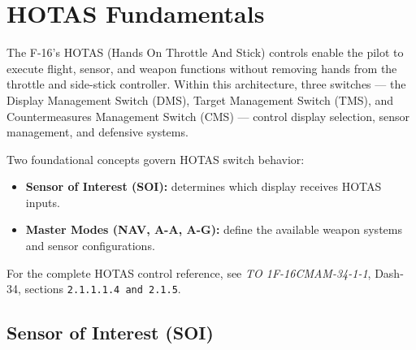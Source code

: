 \documentclass[11pt, a4paper, twoside]{report}
\newcommand{\dashrefs}[1]{\textit{TO 1F-16CMAM-34-1-1}, Dash-34, sections \texttt{#1}}
\begin{document}

\chapter{HOTAS Fundamentals}
\label{chap:C2}
The F-16’s HOTAS (Hands On Throttle And Stick) controls enable the pilot to execute flight, sensor, and weapon functions without removing hands from the throttle and side-stick controller. Within this architecture, three switches — the Display Management Switch (DMS), Target Management Switch (TMS), and Countermeasures Management Switch (CMS) — control display selection, sensor management, and defensive systems.

Two foundational concepts govern HOTAS switch behavior:

\begin{itemize}
    \item \textbf{Sensor of Interest (SOI):} determines which display receives HOTAS inputs.
    \item \textbf{Master Modes (NAV, A-A, A-G):} define the available weapon systems and sensor configurations.
\end{itemize}

For the complete HOTAS control reference, see \dashrefs{2.1.1.1.4 and 2.1.5}.

\section{Sensor of Interest (SOI)}
\label{sec:C2-S1}
\end{document}
